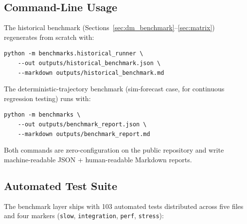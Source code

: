 \documentclass[12pt]{article}
\begin{document}
\subsection{Command-Line Usage}
\label{app:repro_cli}

The historical benchmark (Sections~\ref{sec:dm_benchmark}--\ref{sec:matrix}) regenerates from scratch with:

\begin{verbatim}
python -m benchmarks.historical_runner \
    --out outputs/historical_benchmark.json \
    --markdown outputs/historical_benchmark.md
\end{verbatim}

The deterministic-trajectory benchmark (sim-forecast case, for continuous regression testing) runs with:

\begin{verbatim}
python -m benchmarks \
    --out outputs/benchmark_report.json \
    --markdown outputs/benchmark_report.md
\end{verbatim}

Both commands are zero-configuration on the public repository and write machine-readable JSON + human-readable Markdown reports.

\subsection{Automated Test Suite}
\label{app:repro_tests}

The benchmark layer ships with 103 automated tests distributed across five files and four markers (\texttt{slow}, \texttt{integration}, \texttt{perf}, \texttt{stress}):
\end{document}
